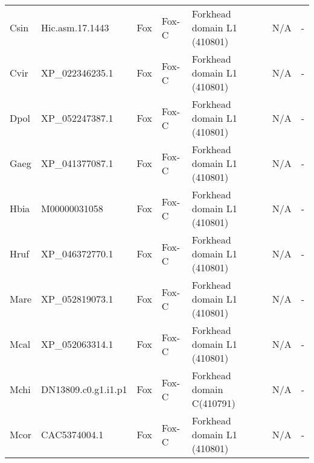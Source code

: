 \documentclass[../main.tex]{subfiles}
\begin{document}
\begin{landscape}
\begin{longtable}{lllllll}
		Csin           & Hic.asm.17.1443       & Fox            & Fox-C               & Forkhead domain L1 (410801)                 & N/A                                                                    & -                    \\
		Cvir           & XP\_022346235.1       & Fox            & Fox-C               & Forkhead domain L1 (410801)                 & N/A                                                                    & -                    \\
		Dpol           & XP\_052247387.1       & Fox            & Fox-C               & Forkhead domain L1 (410801)                 & N/A                                                                    & -                    \\
		Gaeg           & XP\_041377087.1       & Fox            & Fox-C               & Forkhead domain L1 (410801)                 & N/A                                                                    & -                    \\
		Hbia           & M00000031058          & Fox            & Fox-C               & Forkhead domain L1 (410801)                 & N/A                                                                    & -                    \\
		Hruf           & XP\_046372770.1       & Fox            & Fox-C               & Forkhead domain L1 (410801)                 & N/A                                                                    & -                    \\
		Mare           & XP\_052819073.1       & Fox            & Fox-C               & Forkhead domain L1 (410801)                 & N/A                                                                    & -                    \\
		Mcal           & XP\_052063314.1       & Fox            & Fox-C               & Forkhead domain L1 (410801)                 & N/A                                                                    & -                    \\
		Mchi           & DN13809.c0.g1.i1.p1   & Fox            & Fox-C               & Forkhead domain C(410791)                   & N/A                                                                    & -                    \\
		Mcor           & CAC5374004.1          & Fox            & Fox-C               & Forkhead domain L1 (410801)                 & N/A                                                                    & -                    \\

\end{longtable}
\end{landscape}
\end{document}
